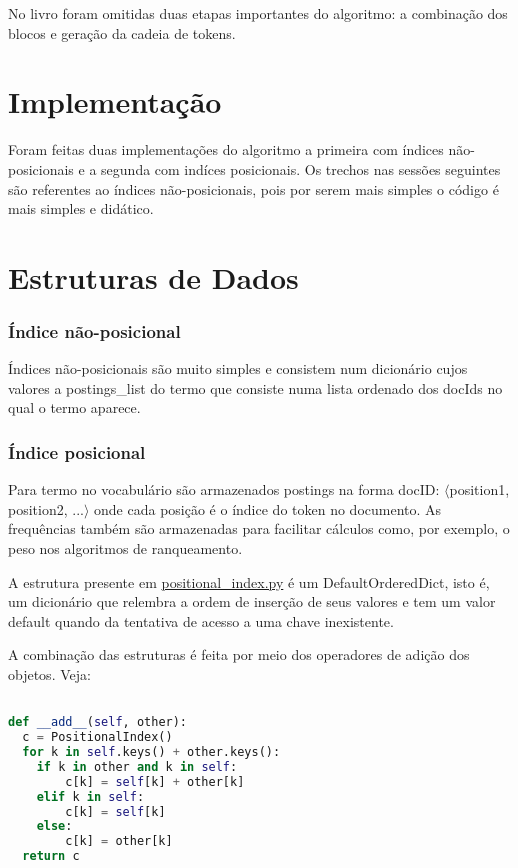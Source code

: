 \documentclass[a4paper]{article}
\begin{document}
No livro foram omitidas duas etapas importantes do algoritmo: a combinação dos blocos e geração da cadeia de tokens.

\section{Implementação}

Foram feitas duas implementações do algoritmo a primeira com índices não-posicionais e a segunda com indíces posicionais. Os trechos nas sessões seguintes são referentes ao índices não-posicionais, pois por serem mais simples o código é mais simples e didático.

\section{Estruturas de Dados}

\subsubsection{Índice não-posicional }

Índices não-posicionais são muito simples e consistem num dicionário cujos valores a postings_list do termo que consiste numa lista ordenado dos docIds no qual o termo aparece.

\subsubsection{Índice posicional}

Para termo no vocabulário são armazenados postings na forma docID: $\langle$position1, position2, ...$\rangle$ onde cada posição é o índice do token no documento. As frequências também são armazenadas para facilitar cálculos como, por exemplo, o peso nos algoritmos de ranqueamento.

A estrutura presente em \href{https://github.com/felipeblassioli/spimi/blob/master/positional_index.py}{positional_index.py} é um DefaultOrderedDict, isto é, um dicionário que relembra a ordem de inserção de seus valores e tem um valor default quando da tentativa de acesso a uma chave inexistente.

A combinação das estruturas é feita por meio dos operadores de adição dos objetos. Veja:

\begin{lstlisting}[language=Python]  % Start your code-block

def __add__(self, other):
  c = PositionalIndex()
  for k in self.keys() + other.keys():
    if k in other and k in self:
    	c[k] = self[k] + other[k]
    elif k in self:
    	c[k] = self[k]
    else:
    	c[k] = other[k]
  return c

\end{lstlisting}
\end{document}
